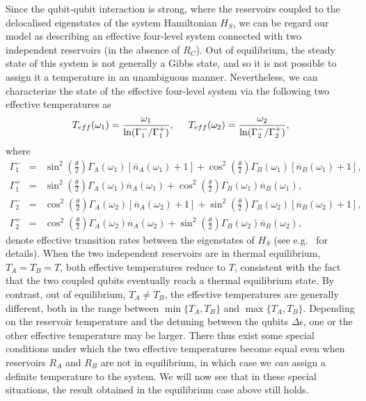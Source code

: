 \documentclass[12pt]{iopart}
\begin{document}
Since the qubit-qubit interaction is strong, where the reservoirs coupled to the delocalised eigenstates of the system Hamiltonian $H_S$, we can be regard our model as describing an effective four-level system connected with two independent reservoirs (in the absence of $R_C$). Out of equilibrium, the steady state of this system is not generally a Gibbs state, and so it is not possible to assign it a temperature in an unambiguous manner. Nevertheless, we can characterize the state of the effective four-level system via the following two effective temperatures \cite{equi7,Teff1,Teff2,Teff3} as
\begin{equation}
\label{Teff}
T_{eff}(\omega_{1})=\frac{\omega_{1}}{\ln(\Gamma_{1}^{-}/\Gamma_{1}^{+})}, \hskip 0.5cm
T_{eff}(\omega_{2})=\frac{\omega_{2}}{\ln(\Gamma_{2}^{-}/\Gamma_{2}^{+})},
\end{equation}
where
\begin{eqnarray}
\label{Gammaspm}
\Gamma_{1}^{-} &=& \sin^{2}(\frac{\theta}{2})\Gamma_{A}(\omega_{1})[\overline{n}_{A}(\omega_{1})+1]
+\cos^{2}(\frac{\theta}{2})\Gamma_{B}(\omega_{1})[\overline{n}_{B}(\omega_{1})+1], \nonumber \\
\Gamma_{1}^{+} &=& \sin^{2}(\frac{\theta}{2})\Gamma_{A}(\omega_{1})\overline{n}_{A}(\omega_{1})
+\cos^{2}(\frac{\theta}{2})\Gamma_{B}(\omega_{1})\overline{n}_{B}(\omega_{1}), \nonumber\\
\Gamma_{2}^{-} &=& \cos^{2}(\frac{\theta}{2})\Gamma_{A}(\omega_{2})[\overline{n}_{A}(\omega_{2})+1]
+\sin^{2}(\frac{\theta}{2})\Gamma_{B}(\omega_{2})[\overline{n}_{B}(\omega_{2})+1], \nonumber\\
\Gamma_{2}^{+} &=& \cos^{2}(\frac{\theta}{2})\Gamma_{A}(\omega_{2})\overline{n}_{A}(\omega_{2})
+\sin^{2}(\frac{\theta}{2})\Gamma_{B}(\omega_{2})\overline{n}_{B}(\omega_{2}),
\end{eqnarray}
denote effective transition rates between the eigenstates of $H_S$ (see e.g.~\cite{equi7} for details). When the two independent reservoirs are in thermal equilibrium, $T_{A}=T_{B}=T$, both effective temperatures reduce to $T$, consistent with the fact that the two coupled qubits eventually reach a thermal equilibrium state. By contrast, out of equilibrium, $T_{A}\neq T_{B}$, the effective temperatures are generally different, both in the range between $\min\{T_A,T_B\}$ and $\max\{T_A,T_B\}$. Depending on the reservoir temperature and the detuning between the qubits $\Delta\epsilon$, one or the other effective temperature may be larger. There thus exist some special conditions under which the two effective temperatures become equal even when reservoirs $R_A$ and $R_B$ are not in equilibrium, in which case we \textit{can} assign a definite temperature to the system. We will now see that in these special situations, the result obtained in the equilibrium case above still holds.
\end{document}
